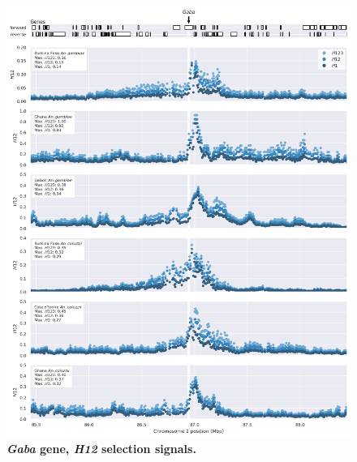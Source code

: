 \documentclass[a4paper,11pt,abstracton,hidelinks]{scrartcl}
\begin{document}
\begin{figure}[t!]
	\begin{center}
		\includegraphics*[width=1.1\linewidth,center]{artwork/locus_gaba_h12.png}
	\end{center}
	\caption[\textit{Gaba} gene, \textit{H12} selection signals]{
	\textbf{\textit{Gaba} gene, \textit{H12} selection signals.}
	} 
	\label{fig:locus_gaba_h12}
\end{figure}


\clearpage
\end{document}
